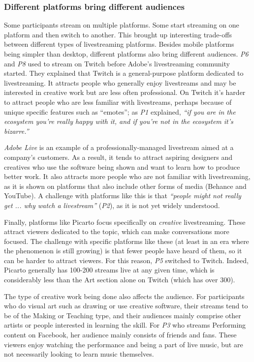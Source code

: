 \subsubsection{Different platforms bring different audiences}
Some participants stream on multiple platforms. Some start streaming on one platform and then switch to another. This brought up interesting trade-offs between different types of livestreaming platforms. Besides mobile platforms being simpler than desktop, different platforms also bring different audiences. \textit{P6} and \textit{P8} used to stream on Twitch before Adobe's livestreaming community started. They explained that Twitch is a general-purpose platform dedicated to livestreaming. It attracts people who generally enjoy livestreams and may be interested in creative work but are less often professional. On Twitch it's harder to attract people who are less familiar with livestreams, perhaps because of unique specific features such as ``emotes''; as \textit{P1} explained, \textit{``if you are in the ecosystem you're really happy with it, and if you're not in the ecosystem it's bizarre.''}

\textit{Adobe Live} is an example of a professionally-managed live\-stream aimed at a company's customers. As a result, it tends to attract aspiring designers and creatives who use the software being shown and want to learn how to produce better work. It also attracts more people who are not familiar with livestreaming, as it is shown on platforms that also include other forms of media (Behance and YouTube). A challenge with platforms like this is that \textit{``people might not really get ... why watch a livestream''} (\textit{P2}), as it is not yet widely understood.

Finally, platforms like Picarto focus specifically on \textit{creative} livestreaming. These attract viewers dedicated to the topic, which can make conversations more focused. The challenge with specific platforms like these (at least in an era where the phenomenon is still growing) is that fewer people have heard of them, so it can be harder to attract viewers. For this reason, \textit{P5} switched to Twitch. Indeed, Picarto generally has 100-200 streams live at any given time, which is considerably less than the Art section alone on Twitch (which has over 300).

The type of creative work being done also affects the audience. For participants who do visual art such as drawing or use creative software, their streams tend to be of the Making or Teaching type, and their audiences mainly comprise other artists or people interested in learning the skill. For \textit{P3} who streams Performing content on Facebook, her audience mainly consists of friends and fans. These viewers enjoy watching the performance and being a part of live music, but are not necessarily looking to learn music themselves.
 
